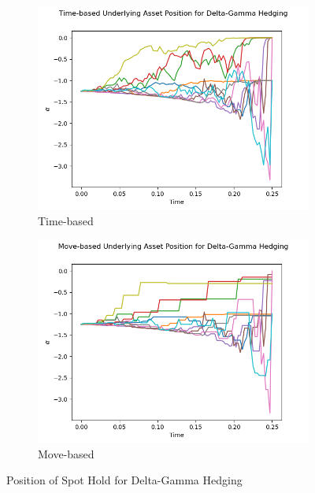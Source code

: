 \documentclass[12pt]{article}
\begin{document}
\begin{figure}[H]
  \centering
  \begin{subfigure}{.5\textwidth}
    \centering
    \includegraphics[width=\linewidth]{asset-time.png}
    \caption{Time-based}
  \end{subfigure}%
  \begin{subfigure}{.5\textwidth}
    \centering
    \includegraphics[width=\linewidth]{asset-move.png}
    \caption{Move-based}
  \end{subfigure}%
  \caption{Position of Spot Hold for Delta-Gamma Hedging}
\end{figure}
\end{document}
